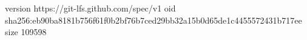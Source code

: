 version https://git-lfs.github.com/spec/v1
oid sha256:eb90ba8181b756f61f0b2bf76b7ced29bb32a15b0d65de1c4455572431b717ee
size 109598
